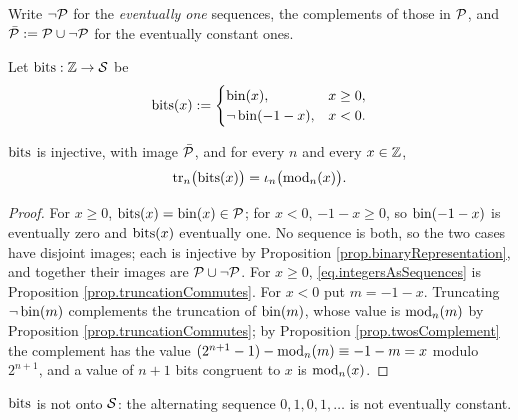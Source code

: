 Write $\neg \mathcal{P}$ for the \emph{eventually one} sequences,
the complements of those in $\mathcal{P}$,
and $\bar{\mathcal{P}} := \mathcal{P} \cup \neg\mathcal{P}$ for the eventually
constant ones.

\begin{defi}\label{def.twosComplementSequence}
 Let $\mathrm{bits} : \mathbb{Z} \to \mathcal{S}$ be
 \begin{equation*}
  \mathrm{bits}(x) :=
  \begin{cases}
   \mathrm{bin}(x), & x \geq 0, \\
   \neg\, \mathrm{bin}(-1 - x), & x < 0 .
  \end{cases}
 \end{equation*}
\end{defi}

\begin{prop}\label{prop.integersAsSequences}
 $\mathrm{bits}$ is injective, with image $\bar{\mathcal{P}}$, and for every $n$ and every
 $x \in \mathbb{Z}$,
 \begin{equation}\label{eq.integersAsSequences}
  \mathrm{tr}_{n}\big(\mathrm{bits}(x)\big) = \iota_{n}\big(\mathrm{mod}_{n}(x)\big) .
 \end{equation}
\end{prop}
\begin{proof}
 For $x \geq 0$, $\mathrm{bits}(x) = \mathrm{bin}(x) \in \mathcal{P}$;
 for $x < 0$, $-1 - x \geq 0$, so $\mathrm{bin}(-1-x)$ is eventually zero and
 $\mathrm{bits}(x)$ eventually one.
 No sequence is both, so the two cases have disjoint images;
 each is injective by Proposition \ref{prop.binaryRepresentation},
 and together their images are $\mathcal{P} \cup \neg\mathcal{P}$.
 For $x \geq 0$, \eqref{eq.integersAsSequences} is Proposition \ref{prop.truncationCommutes}.
 For $x < 0$ put $m = -1 - x$.
 Truncating $\neg\,\mathrm{bin}(m)$ complements the truncation of
 $\mathrm{bin}(m)$,
 whose value is $\mathrm{mod}_{n}(m)$ by Proposition \ref{prop.truncationCommutes};
 by Proposition \ref{prop.twosComplement} the complement has the value
 $(2^{n+1} - 1) - \mathrm{mod}_{n}(m) \equiv -1 - m = x$ modulo $2^{n+1}$,
 and a value of $n+1$ bits congruent to $x$ is $\mathrm{mod}_{n}(x)$.
\end{proof}

$\mathrm{bits}$ is not onto $\mathcal{S}$:
the alternating sequence $0, 1, 0, 1, \dots$ is not eventually constant.

